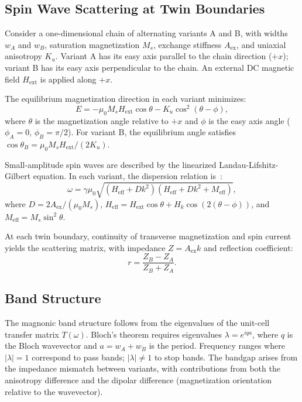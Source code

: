 \documentclass[aip,jap,reprint,floatfix,nofootinbib]{revtex4-2}
\begin{document}
\subsection{Spin Wave Scattering at Twin Boundaries}
\label{sec:scattering}

Consider a one-dimensional chain of alternating variants A and B, with widths $w_A$ and $w_B$, saturation magnetization $M_s$, exchange stiffness $A_{\mathrm{ex}}$, and uniaxial anisotropy $K_u$. Variant A has its easy axis parallel to the chain direction ($+x$); variant B has its easy axis perpendicular to the chain. An external DC magnetic field $H_{\mathrm{ext}}$ is applied along $+x$.

The equilibrium magnetization direction in each variant minimizes:
\begin{equation}
E = -\mu_0 M_s H_{\mathrm{ext}} \cos\theta - K_u \cos^2(\theta - \phi),
\label{eq:energy}
\end{equation}
where $\theta$ is the magnetization angle relative to $+x$ and $\phi$ is the easy axis angle ($\phi_A = 0$, $\phi_B = \pi/2$). For variant B, the equilibrium angle satisfies $\cos\theta_B = \mu_0 M_s H_{\mathrm{ext}} / (2K_u)$.

Small-amplitude spin waves are described by the linearized Landau-Lifshitz-Gilbert equation. In each variant, the dispersion relation is~\cite{Stancil2009}:
\begin{equation}
\omega = \gamma \mu_0 \sqrt{(H_{\mathrm{eff}} + D k^2)(H_{\mathrm{eff}} + D k^2 + M_{\mathrm{eff}})},
\label{eq:dispersion}
\end{equation}
where $D = 2A_{\mathrm{ex}}/(\mu_0 M_s)$, $H_{\mathrm{eff}} = H_{\mathrm{ext}} \cos\theta + H_k \cos(2(\theta-\phi))$, and $M_{\mathrm{eff}} = M_s \sin^2\theta$.

At each twin boundary, continuity of transverse magnetization and spin current yields the scattering matrix, with impedance $Z = A_{\mathrm{ex}} k$ and reflection coefficient:
\begin{equation}
r = \frac{Z_B - Z_A}{Z_B + Z_A}.
\label{eq:scattering}
\end{equation}

\subsection{Band Structure}
\label{sec:bandstructure}

The magnonic band structure follows from the eigenvalues of the unit-cell transfer matrix $T(\omega)$. Bloch's theorem requires eigenvalues $\lambda = e^{i q a}$, where $q$ is the Bloch wavevector and $a = w_A + w_B$ is the period. Frequency ranges where $|\lambda| = 1$ correspond to pass bands; $|\lambda| \neq 1$ to stop bands. The bandgap arises from the impedance mismatch between variants, with contributions from both the anisotropy difference and the dipolar difference (magnetization orientation relative to the wavevector).
\end{document}

